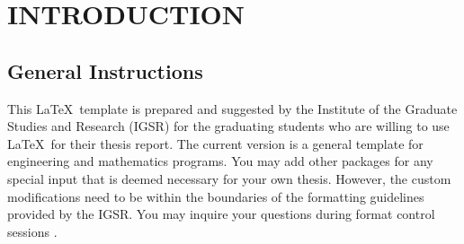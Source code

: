 \documentclass[a4paper,12pt,oneside]{report}
\begin{document}








\begin{symbolsandabbreviations}
\end{symbolsandabbreviations}






\chapter{INTRODUCTION}\label{ch:introduction}

\section{General Instructions}\label{sec:generalinstructions}
This \LaTeX~template is prepared and suggested  by the Institute of the Graduate Studies and Research (IGSR) for the graduating students who are willing to use \LaTeX~for their thesis report. The current version is a general template for engineering and mathematics programs. You may add other packages for any special input that is deemed necessary for your own thesis. However, the custom modifications need to be within the boundaries of the formatting guidelines provided by the IGSR. You may inquire your questions during format control sessions \cite{igsr}.
\end{document}
